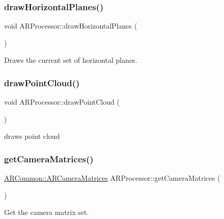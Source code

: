 \subsubsection{\texorpdfstring{draw\+Horizontal\+Planes()}{drawHorizontalPlanes()}}
{\footnotesize\ttfamily void A\+R\+Processor\+::draw\+Horizontal\+Planes (\begin{DoxyParamCaption}{ }\end{DoxyParamCaption})}



Draws the current set of horizontal planes. 

\mbox{\label{class_a_r_processor_ae938bf188d56d8b30b141b2fa23e96f8}} 
\subsubsection{\texorpdfstring{draw\+Point\+Cloud()}{drawPointCloud()}}
{\footnotesize\ttfamily void A\+R\+Processor\+::draw\+Point\+Cloud (\begin{DoxyParamCaption}{ }\end{DoxyParamCaption})}



draws point cloud 

\mbox{\label{class_a_r_processor_a82a9b334360ebccd844e7cf5584eff8b}} 
\subsubsection{\texorpdfstring{get\+Camera\+Matrices()}{getCameraMatrices()}}
{\footnotesize\ttfamily \hyperlink{struct_a_r_common_1_1_a_r_camera_matrices}{A\+R\+Common\+::\+A\+R\+Camera\+Matrices} A\+R\+Processor\+::get\+Camera\+Matrices (\begin{DoxyParamCaption}{ }\end{DoxyParamCaption})\hspace{0.3cm}{\ttfamily [inline]}}



Get the camera matrix set. 

\mbox{\label{class_a_r_processor_a5eb8045000bc6e0ad3d41d7bbf832047}} 

